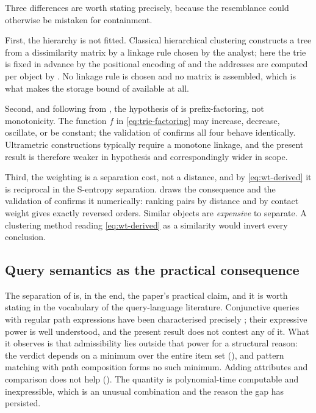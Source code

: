 \documentclass[11pt,twocolumn,a4paper]{article}
\theoremstyle{thmstyle}
\theoremstyle{definition}
\theoremstyle{remark}
\begin{document}
Three differences are worth stating precisely, because the resemblance
could otherwise be mistaken for containment.

First, the hierarchy is not fitted. Classical hierarchical clustering
constructs a tree from a dissimilarity matrix by a linkage rule chosen
by the analyst; here the trie is fixed in advance by the positional
encoding of  and the addresses are computed
per object by . No linkage rule is chosen and no
matrix is assembled, which is what makes the storage bound of
 available at all.

Second, and following from , the
hypothesis of  is prefix-factoring, not
monotonicity. The function $f$ in \eqref{eq:trie-factoring} may
increase, decrease, oscillate, or be constant; the validation of
 confirms all four behave identically. Ultrametric
constructions typically require a monotone linkage, and the present
result is therefore weaker in hypothesis and correspondingly wider in
scope.

Third, the weighting is a separation cost, not a distance, and by
\eqref{eq:wt-derived} it is reciprocal in the S-entropy separation.
 draws the consequence and the validation of
 confirms it numerically: ranking pairs by distance and
by contact weight gives exactly reversed orders. Similar objects are
\emph{expensive} to separate. A clustering method reading
\eqref{eq:wt-derived} as a similarity would invert every conclusion.

\subsection{Query semantics as the practical consequence}

The separation of  is, in the end, the
paper's practical claim, and it is worth stating in the vocabulary of
the query-language literature. Conjunctive queries with regular path
expressions have been characterised precisely
\citep{perez2009,barcelo2013,angles2017}; their expressive power is
well understood, and the present result does not contest any of it.
What it observes is that admissibility lies outside that power for a
structural reason: the verdict depends on a minimum over the entire
item set (), and pattern matching with
path composition forms no such minimum. Adding attributes and
comparison does not help (). The quantity is
polynomial-time computable and inexpressible, which is an unusual
combination and the reason the gap has persisted.
\end{document}
